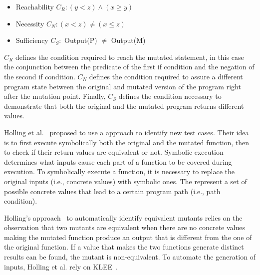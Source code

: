 \begin{itemize}
	\item Reachability $C_R: (y < z) \wedge (x \geq y)$
	\item Necessity $C_N: (x < z) \neq (x \leq z)$
	\item Sufficiency $C_S:$ Output(P) $\neq$ Output(M)
\end{itemize}

$C_R$ defines the condition required to reach the mutated statement, in this case the conjunction between the predicate of the first if condition and the negation of the second if condition. $C_N$ defines the condition required to assure a different program state between the original and mutated version of the program right after the mutation point. Finally, $C_S$ defines the condition necessary to demonstrate that both the original and the mutated program returns different values.

Holling et al.~\cite{holling2016nequivack} proposed to use a  approach to identify new test cases. Their idea is to first execute symbolically both the original and the mutated function, then to check if their return values are equivalent or not. 
Symbolic execution determines what inputs cause each part of a function to be covered during execution. To symbolically execute a function, it is necessary to replace the original inputs (i.e., concrete values) with symbolic ones. The  represent a set of possible concrete values that lead to a certain program path (i.e., path condition). 


Holling's approach~\cite{holling2016nequivack} to automatically identify equivalent mutants relies on the observation that 
two mutants are equivalent when there are no concrete values making the mutated function produce an output that is different from the one of the original function.
If a value that makes the two functions generate distinct results can be found, the mutant is non-equivalent.
To automate the generation of inputs, Holling et al. rely on KLEE~\cite{cadar2008klee}.

